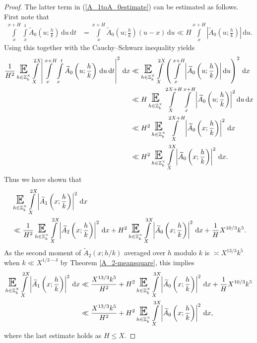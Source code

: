 \documentclass[a4paper,10pt,twoside]{amsart}
\theoremstyle{definition}
\numberwithin{equation}{section}
\newcommand\E{\mathbb{E}}
\renewcommand\:{\colon}
\begin{document}
\begin{proof}
The latter term in (\ref{A_1toA_0estimate}) can be estimated as follows. First note that
\begin{align*}
\int\limits_x^{x+H}\int\limits_x^t\widetilde A_0\left(u;\frac hk\right)\,\mathrm d u\,\mathrm d t&=\int\limits_x^{x+H}\widetilde A_0\left(u;\frac hk\right)(u-x)\,\mathrm d u
\ll H\int\limits_x^{x+H}\left|\widetilde A_0\left(u;\frac hk\right)\right|\,\mathrm d u.
\end{align*}
Using this together with the Cauchy--Schwarz inequality yields
\begin{align*}
\frac1{H^2}\mathop{\text{\LARGE$\E$}}_{h\in\mathbb Z_k^\times}\int\limits_X^{2X}\left|\int\limits_x^{x+H}\int\limits_x^t\widetilde A_0\left(u;\frac hk\right)\,\mathrm d u\,\mathrm d t\right|^2\,\mathrm d x &\ll\mathop{\text{\LARGE$\E$}}_{h\in\mathbb Z_k^\times}\int\limits_X^{2X}\left(\int\limits_x^{x+H}\left|\widetilde A_0\left(u;\frac hk\right)\right|\mathrm d u\right)^2\,\mathrm d x\\
&\ll H\mathop{\text{\LARGE$\E$}}_{h\in\mathbb Z_k^\times}\int\limits_X^{2X+H}\int\limits_x^{x+H}\left|\widetilde A_0\left(u;\frac hk\right)\right|^2\mathrm d u\,\mathrm d x \\
&\ll H^2\mathop{\text{\LARGE$\E$}}_{h\in\mathbb Z_k^\times}\int\limits_X^{2X+H}\left|\widetilde A_0\left(x;\frac hk\right)\right|^2\,\mathrm d x\\
&\ll H^2\mathop{\text{\LARGE$\E$}}_{h\in\mathbb Z_k^\times}\int\limits_X^{3X}\left|\widetilde A_0\left(x;\frac hk\right)\right|^2\,\mathrm d x. 
\end{align*}
Thus we have shown that
\begin{align*}
&\mathop{\text{\LARGE$\E$}}_{h\in\mathbb Z_k^\times}\int\limits_X^{2X}\left|\widetilde A_1\left(x;\frac hk\right)\right|^2\,\mathrm dx\\
&\ll\frac1{H^2}\mathop{\text{\LARGE$\E$}}_{h\in\mathbb Z_k^\times}\int\limits_X^{2X}\left|\widetilde A_2\left(x;\frac hk\right)\right|^2\,\mathrm dx
+H^2\mathop{\text{\LARGE$\E$}}_{h\in\mathbb Z_k^\times}\int\limits_X^{3X}\left|\widetilde A_0\left(x;\frac hk\right)\right|^2\,\mathrm dx+\frac1H X^{10/3}k^5.
\end{align*}
As the second moment of $\widetilde A_2(x;h/k)$ averaged over $h$ modulo $k$ is $\asymp X^{13/3}k^5$ when $k\ll X^{1/3-\delta}$ by Theorem \ref{A_2-meansquare}, this implies
\begin{align}\label{connecting_ineq_1}
\mathop{\text{\LARGE$\E$}}_{h\in\mathbb Z_k^\times}\int\limits_X^{2X}\left|\widetilde A_1\left(x;\frac hk\right)\right|^2\,\mathrm dx&\ll\frac{X^{13/3}k^5}{H^2}+H^2\mathop{\text{\LARGE$\E$}}_{h\in\mathbb Z_k^\times}\int\limits_X^{3X}\left|\widetilde A_0\left(x;\frac hk\right)\right|^2\,\mathrm dx+\frac1H X^{10/3}k^5 \nonumber \\
&\ll\frac{X^{13/3}k^5}{H^2}+H^2\mathop{\text{\LARGE$\E$}}_{h\in\mathbb Z_k^\times}\int\limits_X^{3X}\left|\widetilde A_0\left(x;\frac hk\right)\right|^2\,\mathrm dx, 
\end{align}
where the last estimate holds as $H\leq X$.


\end{proof}
\end{document}
